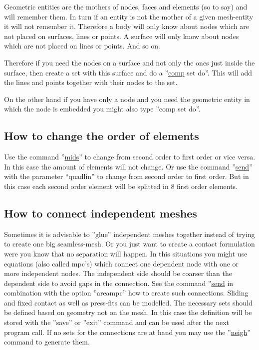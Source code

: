 \documentclass{article}
\providecommand{\htmlref}[2]{\hyperref[#2]{#1}}
\begin{document}
\begin{appendix}
Geometric entities are the mothers of nodes, faces and elements (so to say) and will remember them. In turn if an entity is not the mother of a given mesh-entity it will not remember it. Therefore a body will only know about nodes which are not placed on surfaces, lines or points. A surface will only know about nodes which are not placed on lines or points. And so on.

Therefore if you need the nodes on a surface and not only the ones just inside the surface, then create a set with this surface and do a ''\htmlref{comp}{comp} set do''. This will add the lines and points together with their nodes to the set.

On the other hand if you have only a node and you need the geometric entity in which the node is embedded you might also type ''comp set do''.


\subsection{\label{How to change the order of elements}How to change the order of elements}
Use the command ''\htmlref{mids}{mids}'' to change from second order to first order or vice versa. In this case the amount of elements will not change. Or use the command ''\htmlref{send}{send}'' with the parameter ``quadlin'' to change from second order to first order. But in this case each second order element will be splitted in 8 first order elements. 


\subsection{\label{How to connect independent meshes}How to connect independent meshes}
Sometimes it is advisable to ''glue'' independent meshes together instead of trying to create one big seamless-mesh. Or you just want to create a contact formulation were you know that no separation will happen. In this situations you might use equations (also called mpc's) which connect one dependent node with one or more independent nodes. The independent side should be coarser than the dependent side to avoid gaps in the connection. See the command ''\htmlref{send}{send} in combination with the option ''areampc'' how to create such connections. Sliding and fixed contact as well as press-fits can be modelled. The necessary sets should be defined based on geometry not on the mesh. In this case the definition will be stored with the ''save'' or ''exit'' command and can be used after the next program call. If no sets for the connections are at hand you may use the ''\htmlref{neigh}{neigh}'' command to generate them.


\end{appendix}
\end{document}
